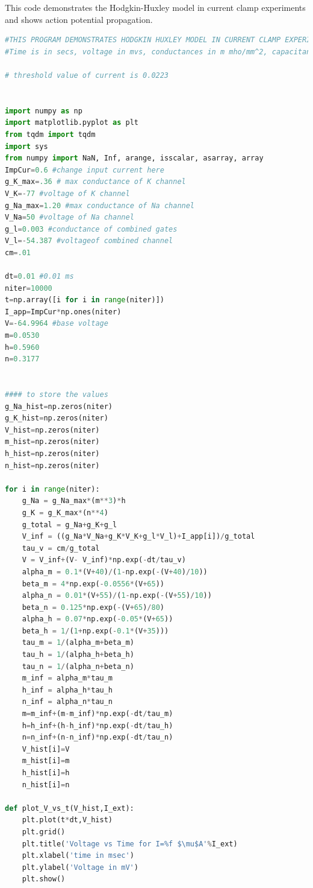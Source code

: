 \documentclass[12pt,a4paper]{report}
\begin{document}
\appendix


This code demonstrates the Hodgkin-Huxley model in current clamp experiments and shows action potential propagation.

\begin{lstlisting}[language=Python, caption={Python code for Hodgkin-Huxley simulation}, label={lst:python_code}]
#THIS PROGRAM DEMONSTRATES HODGKIN HUXLEY MODEL IN CURRENT CLAMP EXPERIMENTS AND SHOWS ACTION POTENTIAL PROPAGATION
#Time is in secs, voltage in mvs, conductances in m mho/mm^2, capacitance in uF/mm^2

# threshold value of current is 0.0223


import numpy as np
import matplotlib.pyplot as plt
from tqdm import tqdm
import sys
from numpy import NaN, Inf, arange, isscalar, asarray, array
ImpCur=0.6 #change input current here
g_K_max=.36 # max conductance of K channel
V_K=-77 #voltage of K channel
g_Na_max=1.20 #max conductance of Na channel
V_Na=50 #voltage of Na channel
g_l=0.003 #conductance of combined gates
V_l=-54.387 #voltageof combined channel
cm=.01

dt=0.01 #0.01 ms
niter=10000
t=np.array([i for i in range(niter)])
I_app=ImpCur*np.ones(niter)
V=-64.9964 #base voltage
m=0.0530
h=0.5960
n=0.3177


#### to store the values
g_Na_hist=np.zeros(niter)
g_K_hist=np.zeros(niter)
V_hist=np.zeros(niter)
m_hist=np.zeros(niter)
h_hist=np.zeros(niter)
n_hist=np.zeros(niter)

for i in range(niter):
    g_Na = g_Na_max*(m**3)*h
    g_K = g_K_max*(n**4)
    g_total = g_Na+g_K+g_l
    V_inf = ((g_Na*V_Na+g_K*V_K+g_l*V_l)+I_app[i])/g_total
    tau_v = cm/g_total
    V = V_inf+(V- V_inf)*np.exp(-dt/tau_v)
    alpha_m = 0.1*(V+40)/(1-np.exp(-(V+40)/10))
    beta_m = 4*np.exp(-0.0556*(V+65))
    alpha_n = 0.01*(V+55)/(1-np.exp(-(V+55)/10))
    beta_n = 0.125*np.exp(-(V+65)/80)
    alpha_h = 0.07*np.exp(-0.05*(V+65))
    beta_h = 1/(1+np.exp(-0.1*(V+35)))
    tau_m = 1/(alpha_m+beta_m)
    tau_h = 1/(alpha_h+beta_h)
    tau_n = 1/(alpha_n+beta_n)
    m_inf = alpha_m*tau_m
    h_inf = alpha_h*tau_h
    n_inf = alpha_n*tau_n
    m=m_inf+(m-m_inf)*np.exp(-dt/tau_m)
    h=h_inf+(h-h_inf)*np.exp(-dt/tau_h)
    n=n_inf+(n-n_inf)*np.exp(-dt/tau_n)
    V_hist[i]=V
    m_hist[i]=m
    h_hist[i]=h
    n_hist[i]=n

def plot_V_vs_t(V_hist,I_ext):
    plt.plot(t*dt,V_hist)
    plt.grid()
    plt.title('Voltage vs Time for I=%f $\mu$A'%I_ext)
    plt.xlabel('time in msec')
    plt.ylabel('Voltage in mV')
    plt.show()


\end{lstlisting}
\end{document}
